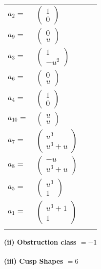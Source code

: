 \documentclass[1p]{elsarticle_modified}
\theoremstyle{definition}
\begin{document}
\begin{tabular}{m{7pt} m{180pt} m{7pt} m{180pt} }
\flushright $a_{2}=$&$\begin{pmatrix}1\\0\end{pmatrix}$ \\
\flushright $a_{9}=$&$\begin{pmatrix}0\\u\end{pmatrix}$ \\
\flushright $a_{3}=$&$\begin{pmatrix}1\\- u^2\end{pmatrix}$ \\
\flushright $a_{6}=$&$\begin{pmatrix}0\\u\end{pmatrix}$ \\
\flushright $a_{4}=$&$\begin{pmatrix}1\\0\end{pmatrix}$ \\
\flushright $a_{10}=$&$\begin{pmatrix}u\\u\end{pmatrix}$ \\
\flushright $a_{7}=$&$\begin{pmatrix}u^3\\u^3+u\end{pmatrix}$ \\
\flushright $a_{8}=$&$\begin{pmatrix}- u\\u^3+u\end{pmatrix}$ \\
\flushright $a_{5}=$&$\begin{pmatrix}u^3\\1\end{pmatrix}$ \\
\flushright $a_{1}=$&$\begin{pmatrix}u^3+1\\1\end{pmatrix}$\\&\end{tabular}
\flushleft \textbf{(ii) Obstruction class $= -1$}\\~\\
\flushleft \textbf{(iii) Cusp Shapes $= 6$}\\~\\
\end{document}
